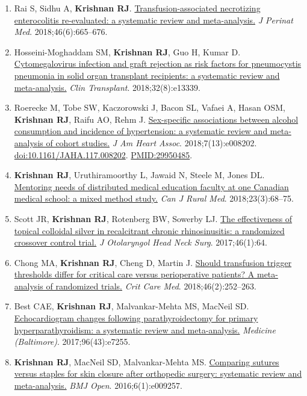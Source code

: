 \documentclass[10.5pt,letterpaper]{article}
\newcommand{\myname}{\textbf{Krishnan RJ}}
\newcommand{\doi}[1]{\href{https://doi.org/#1}{doi:#1}}
\newcommand{\pmid}[1]{\href{https://pubmed.ncbi.nlm.nih.gov/#1/}{PMID:#1}}
\newcommand{\pubtitle}[2]{\href{#1}{#2}}
\begin{document}
\begin{enumerate}
\item Rai S, Sidhu A, \myname. \pubtitle{https://doi.org/10.1515/jpm-2017-0048}{Transfusion-associated necrotizing enterocolitis re-evaluated: a systematic review and meta-analysis.} \textit{J Perinat Med}. 2018;46(6):665--676.
\item Hosseini-Moghaddam SM, \myname, Guo H, Kumar D. \pubtitle{https://doi.org/10.1111/ctr.13339}{Cytomegalovirus infection and graft rejection as risk factors for pneumocystis pneumonia in solid organ transplant recipients: a systematic review and meta-analysis.} \textit{Clin Transplant}. 2018;32(8):e13339.
\item Roerecke M, Tobe SW, Kaczorowski J, Bacon SL, Vafaei A, Hasan OSM, \myname, Raifu AO, Rehm J. \pubtitle{https://doi.org/10.1161/JAHA.117.008202}{Sex-specific associations between alcohol consumption and incidence of hypertension: a systematic review and meta-analysis of cohort studies.} \textit{J Am Heart Assoc}. 2018;7(13):e008202. \doi{10.1161/JAHA.117.008202}. \pmid{29950485}.
\item \myname, Uruthiramoorthy L, Jawaid N, Steele M, Jones DL. \pubtitle{https://epe.lac-bac.gc.ca/100/201/300/cdn_jrn_of_rural_medicine/pdf/2018/Full-23-3-Issue.pdf?nodisclaimer=1}{Mentoring needs of distributed medical education faculty at one Canadian medical school: a mixed method study.} \textit{Can J Rural Med}. 2018;23(3):68--75.
\item Scott JR, \myname, Rotenberg BW, Sowerby LJ. \pubtitle{https://doi.org/10.1186/s40463-017-0241-z}{The effectiveness of topical colloidal silver in recalcitrant chronic rhinosinusitis: a randomized crossover control trial.} \textit{J Otolaryngol Head Neck Surg}. 2017;46(1):64.
\item Chong MA, \myname, Cheng D, Martin J. \pubtitle{https://doi.org/10.1097/CCM.0000000000002873}{Should transfusion trigger thresholds differ for critical care versus perioperative patients? A meta-analysis of randomized trials.} \textit{Crit Care Med}. 2018;46(2):252--263.
\item Best CAE, \myname, Malvankar-Mehta MS, MacNeil SD. \pubtitle{https://doi.org/10.1097/MD.0000000000007255}{Echocardiogram changes following parathyroidectomy for primary hyperparathyroidism: a systematic review and meta-analysis.} \textit{Medicine (Baltimore)}. 2017;96(43):e7255.
\item \myname, MacNeil SD, Malvankar-Mehta MS. \pubtitle{https://doi.org/10.1136/bmjopen-2015-009257}{Comparing sutures versus staples for skin closure after orthopedic surgery: systematic review and meta-analysis.} \textit{BMJ Open}. 2016;6(1):e009257.
\end{enumerate}
\end{document}
